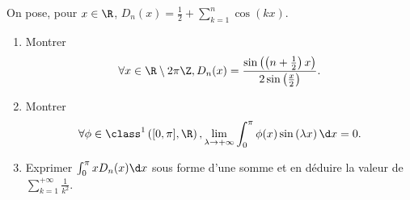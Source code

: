 \begin{enonce}
\begin{exercise}[ID={RMS127 E724},subtitle={Mines-Ponts PSI 2016},tags={}]
  On pose, pour $x\in\R$, $D_n(x) = \frac12 + \sum\limits_{k=1}^n \cos(kx)$.
  \begin{enumerate}
    \item Montrer
      \begin{equation*}
        \forall x\in\R\setminus 2\pi\Z, D_n(x) = \frac{\sin\left( \left( n+\frac12 \right) x \right)}{2\sin\left( \frac x2 \right)}.
      \end{equation*}

    \item 
      Montrer
      \begin{equation*}
        \forall\phi\in\class^1\left( [0,\pi], \R \right), \lim_{\lambda\to+\infty} \int_0^\pi \phi(x) \sin\left( \lambda x \right) \d x = 0.
      \end{equation*}

    \item 
      Exprimer $\int_0^\pi xD_n(x) \d x$ sous forme d'une somme et en déduire la valeur de $\sum\limits_{k=1}^{+\infty} \frac{1}{k^2}$.
      
  \end{enumerate}
\end{exercise}
\begin{solution}

\end{solution}
\end{enonce}
